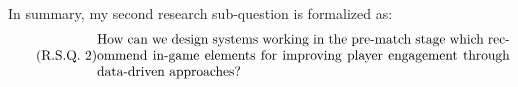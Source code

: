 In summary, my second research sub-question is formalized as:
\begin{equation}
  \tag{R.S.Q. 2}\label{rq2}
  \parbox{\dimexpr\linewidth-4em}{%
    \strut
    How can we design systems working in the pre-match stage which recommend in-game elements for improving player engagement through data-driven approaches?
    \strut
  }
\end{equation}

% 





